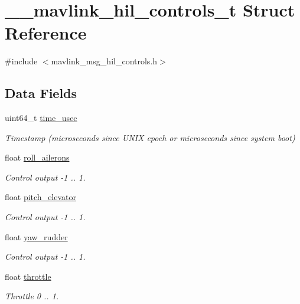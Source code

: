 \hypertarget{struct____mavlink__hil__controls__t}{\section{\+\_\+\+\_\+mavlink\+\_\+hil\+\_\+controls\+\_\+t Struct Reference}
\label{struct____mavlink__hil__controls__t}
}


{\ttfamily \#include $<$mavlink\+\_\+msg\+\_\+hil\+\_\+controls.\+h$>$}

\subsection*{Data Fields}
\begin{DoxyCompactItemize}
\item 
uint64\+\_\+t \hyperlink{struct____mavlink__hil__controls__t_a209e91b6d93c47abba3dc4ed3c6625f2}{time\+\_\+usec}
\begin{DoxyCompactList}\small\item\em Timestamp (microseconds since U\+N\+I\+X epoch or microseconds since system boot) \end{DoxyCompactList}\item 
float \hyperlink{struct____mavlink__hil__controls__t_a65303ffed89e791c1551bf41d3d764dc}{roll\+\_\+ailerons}
\begin{DoxyCompactList}\small\item\em Control output -\/1 .. 1. \end{DoxyCompactList}\item 
float \hyperlink{struct____mavlink__hil__controls__t_ae1da8c6e2be5e9927f9748671d901764}{pitch\+\_\+elevator}
\begin{DoxyCompactList}\small\item\em Control output -\/1 .. 1. \end{DoxyCompactList}\item 
float \hyperlink{struct____mavlink__hil__controls__t_addcaf6167ddb280643e69558a0532dd8}{yaw\+\_\+rudder}
\begin{DoxyCompactList}\small\item\em Control output -\/1 .. 1. \end{DoxyCompactList}\item 
float \hyperlink{struct____mavlink__hil__controls__t_a9249963d6b4959b9cbc952ad86e2a2f1}{throttle}
\begin{DoxyCompactList}\small\item\em Throttle 0 .. 1. \end{DoxyCompactList}\item 

\end{DoxyCompactItemize}
